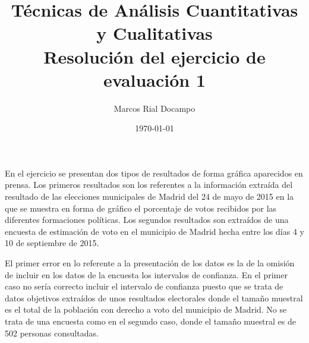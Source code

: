 \documentclass[11pt,a4paper]{article}
\author{Marcos Rial Docampo}
\title{Técnicas de Análisis Cuantitativas y Cualitativas\\Resolución del ejercicio de evaluación 1}
\date{\small{\today}}
\begin{document}
\pagestyle{empty}
\maketitle
\thispagestyle{empty}

En el ejercicio se presentan dos tipos de resultados de forma gráfica aparecidos en prensa. Los primeros resultados son los referentes a la información extraída del resultado de las elecciones municipales de Madrid del 24 de mayo de 2015 en la que se muestra en forma de gráfico el porcentaje de votos recibidos por las diferentes formaciones políticas. Los segundos resultados son extraídos de una encuesta de estimación de voto en el municipio de Madrid hecha entre los días 4 y 10 de septiembre de 2015.

El primer error en lo referente a la presentación de los datos es la de la omisión de incluir en los datos de la encuesta los intervalos de confianza. En el primer caso no sería correcto incluir el intervalo de confianza puesto que se trata de datos objetivos extraídos de unos resultados electorales donde el tamaño muestral es el total de la población con derecho a voto del municipio de Madrid. No se trata de una encuesta como en el segundo caso, donde el tamaño muestral es de 502 personas consultadas.
\end{document}
